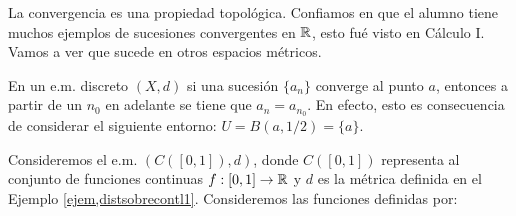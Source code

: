 La convergencia es una propiedad topol\'ogica. Confiamos en que el
alumno tiene muchos ejemplos de sucesiones convergentes en $\rr$,
esto fu\'e visto en C\'alculo I. Vamos a ver que sucede en otros
espacios m\'etricos.

\begin{ejemplo} En un e.m. discreto $(X,d)$ si una sucesi\'on
$\{a_n\}$  converge al punto $a$, entonces a partir de un $n_0$ en
adelante se tiene que $a_n=a_{n_0}$. En efecto, esto es
consecuencia de considerar el siguiente entorno:
$U=B(a,1/2)=\{a\}$.
\end{ejemplo}

\begin{ejemplo}\label{ejem,convfunciones} Consideremos el e.m. $(C([0,1]),d)$, donde
$C([0,1])$ representa al conjunto de funciones continuas
$f:[0,1]\rightarrow\rr$ y $d$ es la m\'etrica definida en el
Ejemplo \vref{ejem,distsobrecontl1}. Consideremos las funciones
definidas por:


\end{ejemplo}
